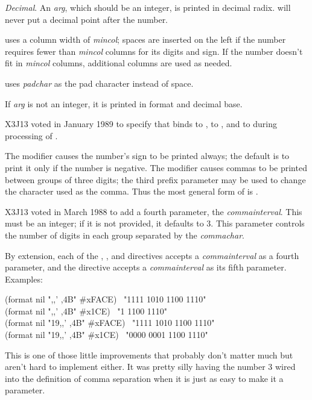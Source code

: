 \begin{flushdesc}
\newpage%

\item[\cd{{\Xtilde}D}]
{\it Decimal}.
An {\it arg}, which should be an integer, is printed in decimal radix.
 will never put a decimal point after the number.

 uses a column width of {\it mincol}; spaces are inserted on
the left if the number requires fewer than {\it mincol} columns for its digits
and sign.  If the number doesn't fit in {\it mincol} columns, additional columns
are used as needed.

 uses {\it padchar} as the pad character
instead of space.

If {\it arg} is not an integer, it is printed
in  format and decimal base.

\begin{new}
X3J13 voted in January 1989
to specify that  binds 
to ,  to , and  to 
during processing of .
\end{new}

The \cd{{\Xatsign}} modifier causes the number's sign to be printed always; the default
is to print it only if the number is negative.
The \cd{:} modifier causes commas to be printed between groups of three digits;
the third prefix parameter may be used to change the character used as the comma.
Thus the most general form of  is
.

\begin{new}
X3J13 voted in March 1988
to add a fourth parameter, the {\it commainterval}.
This must be an integer; if it is not provided,
it defaults to 3.  This parameter controls the number of digits in each
group separated by the {\it commachar}.

By extension, each of the , , and  directives
accepts a {\it commainterval} as a fourth parameter,
and the  directive accepts a {\it commainterval} as its fifth parameter.
Examples:
\begin{lisp}
(format nil "{\Xtilde},,' ,4B" \#xFACE) \EV\ "1111 1010 1100 1110" \\
(format nil "{\Xtilde},,' ,4B" \#x1CE) \EV\ "1 1100 1110" \\
(format nil "{\Xtilde}19,,' ,4B" \#xFACE) \EV\ "1111 1010 1100 1110" \\
(format nil "{\Xtilde}19,,' ,4B" \#x1CE) \EV\ "0000 0001 1100 1110"
\end{lisp}
This is one of those little improvements that probably don't matter much
but aren't hard to implement either.  It was pretty silly having the number 3 wired
into the definition of comma separation when it is just as easy to make it
a parameter.
\end{new}


\end{flushdesc}
